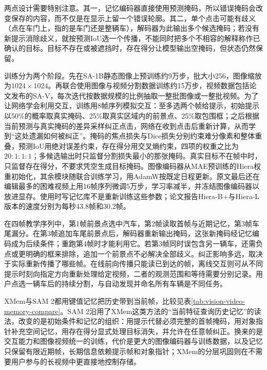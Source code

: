 两点设计需要特别注意。其一，记忆编码器直接使用预测掩码，所以错误掩码会改变保存的内容，而不仅是在显示上留一个错误轮廓。其二，单个点击可能有歧义（点在车门上，指的是车门还是整辆车），解码器为此输出多个候选掩码；若没有新提示消除歧义，就按预测IoU选一个传播，不能同时把多个不相容的解释称作已确认的目标。目标不存在或被遮挡时，存在得分让模型输出空掩码，但状态仍然保留。

训练分为两个阶段。先在SA-1B静态图像上预训练约9万步，批大小256，图像缩放为$1024\times1024$。再联合使用图像与视频分割数据训练约15万步，视频数据包括论文发布的SA-V，每次迭代按数据规模的比例抽取一整批图像或一整批视频。为了让网络学会利用交互，训练用8帧序列模拟交互：至多选两个帧给提示，初始提示以50\%的概率取真实掩码、25\%取真实区域内的前景点、25\%取包围框；之后根据当前预测与真实掩码的差异采样纠正点击，网络在收到点击后重新计算，从而学到“这处遗漏如何被纠正”。掩码的焦点损失与Dice损失分别约束难分像素和整体重叠，预测IoU用绝对误差约束，存在得分用交叉熵约束，四项的权重之比为$20:1:1:1$；多候选输出时只监督分割损失最小的那张掩码。真实目标不在帧中时，只监督存在得分，不要求凭空生成目标掩码。图像编码器从MAE预训练的Hiera权重初始化，其余模块随联合训练学习，用AdamW按既定日程更新。原文最后还在编辑最多的困难视频上用16帧序列微调5万步，学习率减半，并冻结图像编码器以放进显存。使用时写记忆库不是重新训练这些参数；论文报告Hiera-B+与Hiera-L版本的速度分别为每秒43.8帧和30.2帧。

在四帧教学序列中，第1帧前景点选中汽车，第2帧读取首帧与近期记忆，第3帧车尾漏分。在第3帧追加车尾前景点后，解码器重新输出掩码，这张新掩码经记忆编码成为后续条件；重跑第4帧时才能利用它。若第3帧同时误包含另一辆车，还需负点或更明确的框来排除，追加一个前景点不必解决全部歧义。纠正影响多远，取决于实际重新传播了哪些帧。在线前向传播只能读已到达的帧，离线交互则可从不同提示时刻向指定方向重新处理给定视频，二者的观测范围和等待需要分别记录。用户点选一辆车后的持续分割，与自动发现并命名所有车辆是不同任务。

XMem与SAM 2都用键值记忆把历史带到当前帧，比较见表\ref{tab:vision-video-memory-compare}。SAM 2沿用了XMem这类方法的“当前特征查询历史记忆”的读法，改变的是初始条件和记忆的组织：用提示代替必须完整的首帧掩码，用对象指针补充空间记忆，用存在得分显式处理目标消失，并允许在任意帧纠正。换来的是交互能力和图像视频统一的训练，代价是更大的图像编码器与训练数据，以及记忆只保留有限近期帧，长期信息依赖提示帧和对象指针；XMem的分层巩固则在不需要用户参与的长视频中更直接地控制存储。

